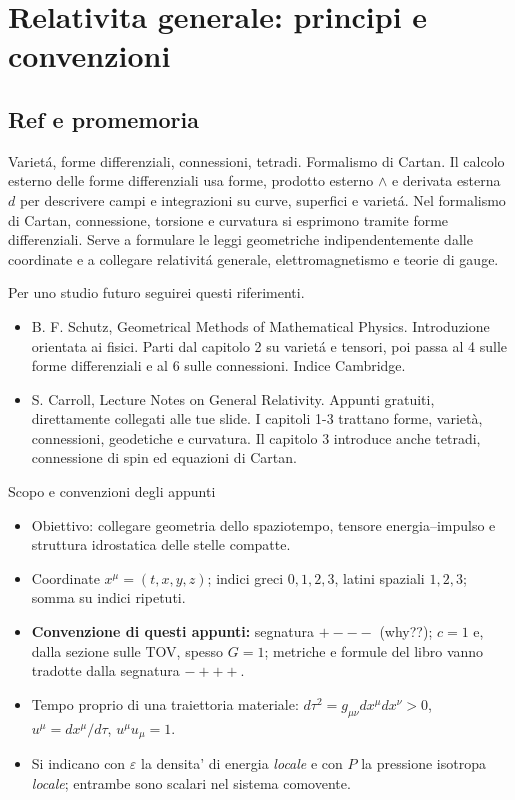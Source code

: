 \section{Relativita generale: principi e convenzioni}

\subsection{Ref e promemoria}

\begin{frame}{\small Variet\'a, forme differenziali, connessioni, tetradi. Formalismo di Cartan.}
    Il calcolo esterno delle forme differenziali usa forme, prodotto esterno \(\wedge\) e derivata esterna \(d\) per descrivere campi e integrazioni su curve, superfici e variet\'a. Nel formalismo di Cartan, connessione, torsione e curvatura si esprimono tramite forme differenziali. Serve a formulare le leggi geometriche indipendentemente dalle coordinate e a collegare relativit\'a generale, elettromagnetismo e teorie di gauge.

Per uno studio futuro seguirei questi riferimenti.
\begin{itemize}
    \item B. F. Schutz, Geometrical Methods of Mathematical Physics. Introduzione orientata ai fisici. Parti dal capitolo 2 su variet\'a e tensori, poi passa al 4 sulle forme differenziali e al 6 sulle connessioni. Indice Cambridge.
    \item  S. Carroll, Lecture Notes on General Relativity. Appunti gratuiti, direttamente collegati alle tue slide. I capitoli 1-3 trattano forme, varietà, connessioni, geodetiche e curvatura. Il capitolo 3 introduce anche tetradi, connessione di spin ed equazioni di Cartan.
\end{itemize}
\end{frame}

\begin{frame}[t]{Scopo e convenzioni degli appunti}\small\raggedright
\begin{itemize}
\item Obiettivo: collegare geometria dello spaziotempo, tensore energia--impulso e struttura idrostatica delle stelle compatte.
\item Coordinate $x^\mu=(t,x,y,z)$; indici greci $0,1,2,3$, latini spaziali $1,2,3$; somma su indici ripetuti.
\item \textbf{Convenzione di questi appunti:} segnatura $+---$ (why??); $c=1$ e, dalla sezione sulle TOV, spesso $G=1$; metriche e formule del libro vanno tradotte dalla segnatura $-+++$. 
\item Tempo proprio di una traiettoria materiale: $d\tau^2=g_{\mu\nu}dx^\mu dx^\nu>0$, $u^\mu=dx^\mu/d\tau$, $u^\mu u_\mu=1$.
\item Si indicano con $\varepsilon$ la densita' di energia \emph{locale} e con $P$ la pressione isotropa \emph{locale}; entrambe sono scalari nel sistema comovente.
\end{itemize}
 \end{frame}

